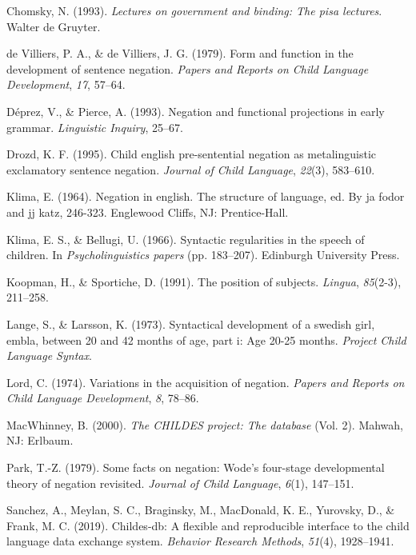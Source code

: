 \documentclass[man,floatsintext,draftall]{apa6}
\begin{document}
\leavevmode\hypertarget{ref-chomsky1993lectures}{}%
Chomsky, N. (1993). \emph{Lectures on government and binding: The pisa lectures}. Walter de Gruyter.

\leavevmode\hypertarget{ref-deVilliers1979}{}%
de Villiers, P. A., \& de Villiers, J. G. (1979). Form and function in the development of sentence negation. \emph{Papers and Reports on Child Language Development}, \emph{17}, 57--64.

\leavevmode\hypertarget{ref-deprez1993negation}{}%
Déprez, V., \& Pierce, A. (1993). Negation and functional projections in early grammar. \emph{Linguistic Inquiry}, 25--67.

\leavevmode\hypertarget{ref-drozd1995}{}%
Drozd, K. F. (1995). Child english pre-sentential negation as metalinguistic exclamatory sentence negation. \emph{Journal of Child Language}, \emph{22}(3), 583--610.

\leavevmode\hypertarget{ref-klima1964negation}{}%
Klima, E. (1964). Negation in english. The structure of language, ed. By ja fodor and jj katz, 246-323. Englewood Cliffs, NJ: Prentice-Hall.

\leavevmode\hypertarget{ref-klimaBellugi1966}{}%
Klima, E. S., \& Bellugi, U. (1966). Syntactic regularities in the speech of children. In \emph{Psycholinguistics papers} (pp. 183--207). Edinburgh University Press.

\leavevmode\hypertarget{ref-koopman1991position}{}%
Koopman, H., \& Sportiche, D. (1991). The position of subjects. \emph{Lingua}, \emph{85}(2-3), 211--258.

\leavevmode\hypertarget{ref-lange1973syntactical}{}%
Lange, S., \& Larsson, K. (1973). Syntactical development of a swedish girl, embla, between 20 and 42 months of age, part i: Age 20-25 months. \emph{Project Child Language Syntax}.

\leavevmode\hypertarget{ref-lord1974variations}{}%
Lord, C. (1974). Variations in the acquisition of negation. \emph{Papers and Reports on Child Language Development}, \emph{8}, 78--86.

\leavevmode\hypertarget{ref-macwhinney2000childes}{}%
MacWhinney, B. (2000). \emph{The CHILDES project: The database} (Vol. 2). Mahwah, NJ: Erlbaum.

\leavevmode\hypertarget{ref-park1979some}{}%
Park, T.-Z. (1979). Some facts on negation: Wode's four-stage developmental theory of negation revisited. \emph{Journal of Child Language}, \emph{6}(1), 147--151.

\leavevmode\hypertarget{ref-sanchez2019childes}{}%
Sanchez, A., Meylan, S. C., Braginsky, M., MacDonald, K. E., Yurovsky, D., \& Frank, M. C. (2019). Childes-db: A flexible and reproducible interface to the child language data exchange system. \emph{Behavior Research Methods}, \emph{51}(4), 1928--1941.
\end{document}
